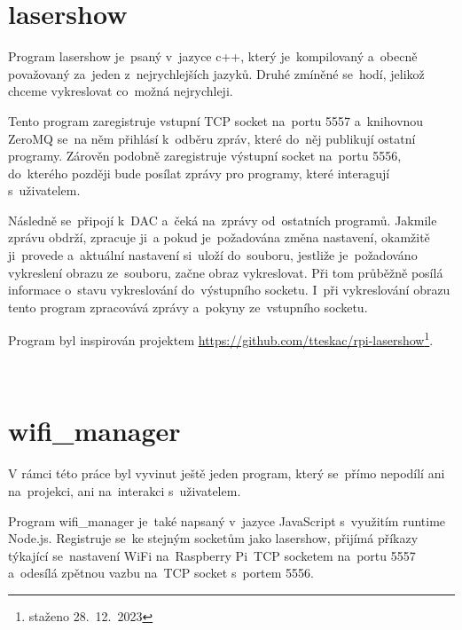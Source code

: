 \section{lasershow}

Program lasershow je~psaný v~jazyce c++, který je~kompilovaný a~obecně považovaný za~jeden z~nejrychlejších jazyků. Druhé zmíněné se~hodí, jelikož chceme vykreslovat co~možná nejrychleji.

Tento program zaregistruje vstupní TCP socket na~portu 5557 a~knihovnou ZeroMQ se~na něm přihlásí k~odběru zpráv, které do~něj publikují ostatní programy. Zárověn podobně zaregistruje výstupní socket na~portu 5556, do~kterého později bude posílat zprávy pro programy, které interagují s~uživatelem.

Následně se~připojí k~DAC a~čeká na~zprávy od~ostatních programů. Jakmile zprávu obdrží, zpracuje ji~a pokud je~požadována změna nastavení, okamžitě ji~provede a~aktuální nastavení si~uloží do~souboru, jestliže je~požadováno vykreslení obrazu ze~souboru, začne obraz vykreslovat. Při tom průběžně posílá informace o~stavu vykreslování do~výstupního socketu. I~při vykreslování obrazu tento program zpracovává zprávy a~pokyny ze~vstupního socketu.

Program byl inspirován projektem \url{https://github.com/tteskac/rpi-lasershow}\footnote{staženo 28.~12.~2023}.


\






\section{wifi\_manager}

V rámci této práce byl vyvinut ještě jeden program, který se~přímo nepodílí ani na~projekci, ani na~interakci s~uživatelem.

Program wifi\_manager je~také napsaný v~jazyce JavaScript s~využitím runtime Node.js. Registruje se~ke stejným socketům jako lasershow, přijímá příkazy týkající se~nastavení WiFi na~Raspberry Pi~TCP socketem na~portu 5557 a~odesílá zpětnou vazbu na~TCP socket s~portem 5556.

